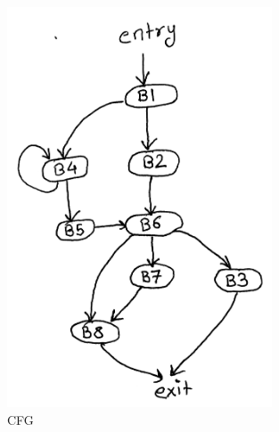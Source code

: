 \begin{itemize}
\begin{figure}
\centering
\includegraphics[width=0.7\textwidth]{images/CFG.jpg}
\caption{CFG}
\label{fig:cfg}
\end{figure}

\end{itemize}
